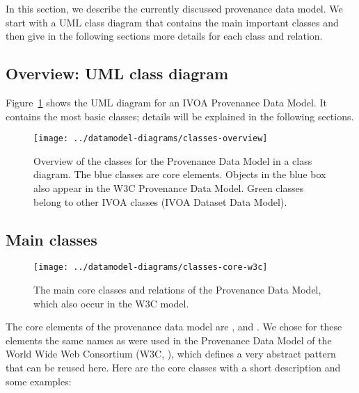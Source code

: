 In this section, we describe the currently discussed provenance data model. We 
start with a UML class diagram that contains the main important classes 
and then give in the following sections more details for each class and relation.

\subsection{Overview: UML class diagram}
Figure~\ref{fig:classdiagram} shows the UML diagram for an IVOA Provenance Data
Model. It contains the most basic classes; details will be explained in the following sections.

\begin{figure}[h]
\centering
\texttt{[image: ../datamodel-diagrams/classes-overview]}
\caption{Overview of the classes for the Provenance Data Model in a class diagram. The blue classes are core elements. Objects in the blue box also appear in the W3C Provenance Data Model. Green classes belong to other IVOA classes (IVOA Dataset Data Model).}
\label{fig:classdiagram}
\end{figure}


\subsection{Main classes}\label{sec:core}

\begin{figure}[h]
\centering
\texttt{[image: ../datamodel-diagrams/classes-core-w3c]}
\caption{The main core classes and relations of the Provenance Data Model, which also occur in the W3C model.}
\label{fig:coreclasses}
\end{figure}


The core elements of the provenance data model are ,  and . 
We chose for these elements the same names as were used in the Provenance Data 
Model of the World Wide Web Consortium (W3C, \cite{std:W3CProvDM}), which defines 
a very abstract pattern that can be reused here. Here are the core classes with 
a short description and some examples:

